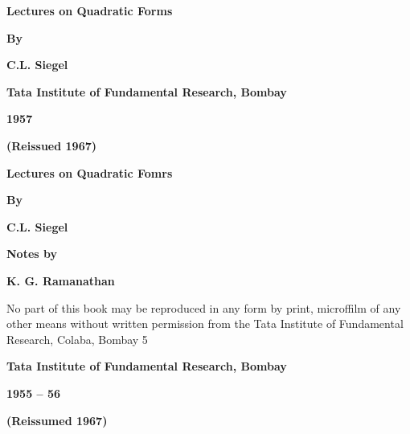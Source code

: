 \thispagestyle{empty}
\begin{center}
{\Large\bf Lectures on Quadratic Forms}
\vskip 1cm

{\bf By}
\medskip

{\large\bf C.L. Siegel}
\vfill

{\bf Tata Institute of Fundamental Research, Bombay}


{\bf 1957}


{\bf (Reissued 1967)}
    
\end{center}
\eject

\thispagestyle{empty}
\begin{center}
{\Large\bf Lectures on Quadratic Fomrs}
\vskip 1cm

{\bf By}
\medskip

{\large\bf C.L. Siegel}
\vfill

{\bf Notes by}
\medskip

{\large\bf K. G. Ramanathan}
\vfill

\parbox{0.7\textwidth}{No part of this book may be reproduced 
in any form by print, microffilm of any
other means without written permission
from the Tata Institute of Fundamental 
Research, Colaba, Bombay 5}
\vfill

{\bf Tata Institute of Fundamental Research, Bombay}


{\bf 1955 -- 56}


{\bf (Reissumed 1967)}
\end{center}
